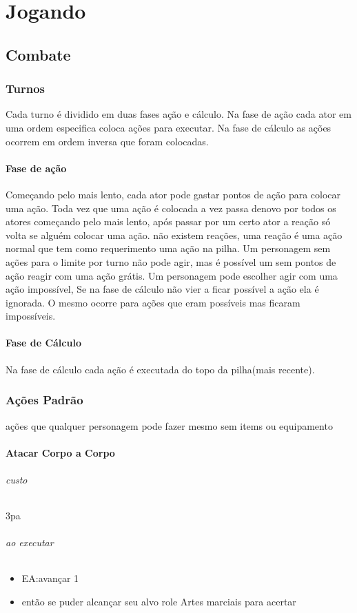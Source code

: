 \part{Jogando}
\chapter{Combate}
\section{Turnos}
%
%
Cada turno é dividido em duas fases ação e cálculo.
Na fase de ação cada ator em uma ordem especifica coloca ações para executar.
Na fase de cálculo as ações ocorrem em ordem inversa que foram colocadas.
%
\subsection{Fase de ação}
Começando pelo mais lento, cada ator pode gastar pontos de ação para colocar uma ação.
Toda vez que uma ação é colocada a vez passa denovo por todos os atores começando pelo mais lento,
após passar por um certo ator a reação só volta se alguém colocar uma ação.
não existem reações, uma reação é uma ação normal que tem como requerimento uma ação na pilha.
Um personagem sem ações para o limite por turno não pode agir, mas é possível um sem pontos de ação reagir com uma ação grátis.
Um personagem pode escolher agir com uma ação impossível,
Se na fase de cálculo não vier a ficar possível a ação ela é ignorada.
O mesmo ocorre para ações que eram possíveis mas ficaram impossíveis.
\subsection{Fase de Cálculo}
Na fase de cálculo cada ação é executada do topo da pilha(mais recente).
%
%
\section{Ações Padrão}
ações que qualquer personagem pode fazer mesmo sem items ou equipamento
%
\subsection{Atacar Corpo a Corpo}
\paragraph{custo} 3pa
\paragraph{ao executar}
\begin{itemize}
  \item EA:avançar 1
  \item então se puder alcançar seu alvo role Artes marciais para acertar
\end{itemize}
%
